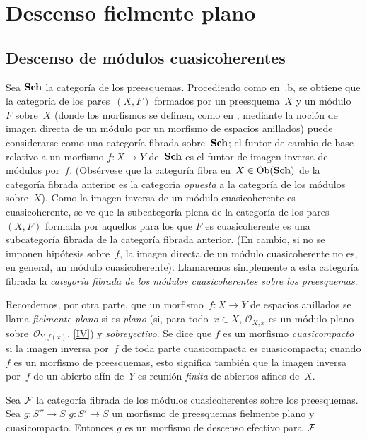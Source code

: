 \chapter{Descenso fielmente plano}
\label{VIII}

\section{Descenso de módulos cuasicoherentes}
\label{VIII.1}

Sea $\Sch$
\label{indnot:hb}%
la categoría de los preesquemas. Procediendo como en~.b,
se obtiene que la categoría de los pares~$(X,F)$ formados por un
preesquema~$X$ y un módulo~$F$ sobre~$X$ (donde los morfismos se definen,
como en \loccit, mediante la noción de imagen directa de un módulo por un
morfismo de espacios anillados) puede considerarse como una categoría
fibrada sobre~$\Sch$; el funtor de cambio de base relativo a un morfismo
$f\colon X\to Y$ de~$\Sch$ es el funtor de imagen inversa de módulos
por~$f$. (Obsérvese que la categoría fibra en~$X\in\Ob(\Sch)$ de la
categoría fibrada anterior es la categoría \emph{opuesta} a la categoría
de los módulos sobre~$X$). Como la imagen inversa de un módulo
cuasicoherente es cuasicoherente, se ve que la subcategoría plena de la
categoría de los pares~$(X,F)$ formada por aquellos para los que $F$ es
cuasicoherente es una subcategoría fibrada de la categoría fibrada
anterior. (En cambio, si no se imponen hipótesis sobre~$f$, la imagen
directa de un módulo cuasicoherente no es, en general, un módulo
cuasicoherente). Llamaremos simplemente a esta categoría fibrada la
\emph{categoría fibrada de los módulos cuasicoherentes sobre los
preesquemas}.

Recordemos, por otra parte, que un morfismo~$f\colon X\to Y$ de espacios
anillados se llama \emph{fielmente plano}
%
%
si es \emph{plano} (\ie si, para todo~$x\in X$,
$\mathcal{O}_{X,x}$ es un módulo plano sobre~$\mathcal{O}_{Y,f(x)}$,
\eqref{IV}) y \emph{sobreyectivo}. Se dice que $f$ es un morfismo
\emph{cuasicompacto} si la imagen inversa por~$f$ de toda parte
cuasicompacta es cuasicompacta; cuando $f$ es un morfismo de
preesquemas, esto significa también que la imagen inversa por~$f$ de un
abierto afín de~$Y$ es reunión \emph{finita} de abiertos afines de~$X$.

\begin{theoreme}
\label{VIII.1.1}
Sea
$\cal{F}$ la categoría fibrada de los módulos cuasicoherentes sobre los
preesquemas. Sea
{$g\colon S''\to S$}
{$g\colon S'\to S$}
un morfismo de preesquemas fielmente plano y cuasicompacto. Entonces $g$
es un morfismo de descenso efectivo para~$\cal{F}$.
%
\end{theoreme}


